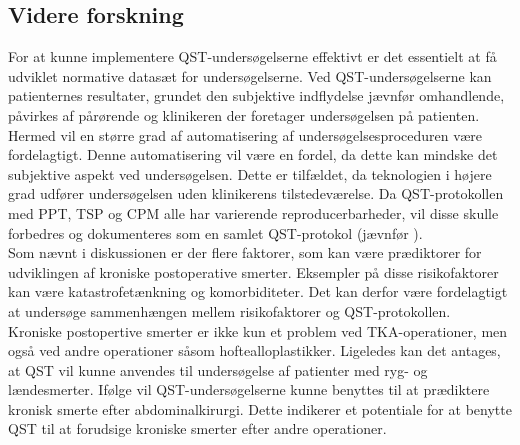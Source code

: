\subsection{Videre forskning}
For at kunne implementere QST-undersøgelserne effektivt er det essentielt at få udviklet normative datasæt for undersøgelserne.  Ved QST-undersøgelserne kan patienternes resultater, grundet den subjektive indflydelse jævnfør  omhandlende, påvirkes af pårørende og klinikeren der foretager undersøgelsen på patienten. Hermed vil en større grad af automatisering af undersøgelsesproceduren være fordelagtigt. Denne automatisering vil være en fordel, da dette kan mindske det subjektive aspekt ved undersøgelsen. Dette er tilfældet, da teknologien i højere grad udfører undersøgelsen uden klinikerens tilstedeværelse. Da QST-protokollen med PPT, TSP og CPM  alle har varierende reproducerbarheder, vil disse skulle forbedres og dokumenteres som en samlet QST-protokol (jævnfør ). \\
Som nævnt i diskussionen er der flere faktorer, som kan være prædiktorer for udviklingen af kroniske postoperative smerter. Eksempler på disse risikofaktorer kan være katastrofetænkning og komorbiditeter. Det kan derfor være fordelagtigt at undersøge sammenhængen mellem risikofaktorer og QST-protokollen.\\
Kroniske postopertive smerter er ikke kun et problem ved TKA-operationer, men også ved andre operationer såsom hoftealloplastikker. \citep{Suokas2012} Ligeledes kan det antages, at QST vil kunne anvendes til undersøgelse af patienter med ryg- og lændesmerter. Ifølge  vil QST-undersøgelserne kunne benyttes til at prædiktere kronisk smerte efter abdominalkirurgi. Dette indikerer et potentiale for at benytte QST til at forudsige kroniske smerter efter andre operationer.